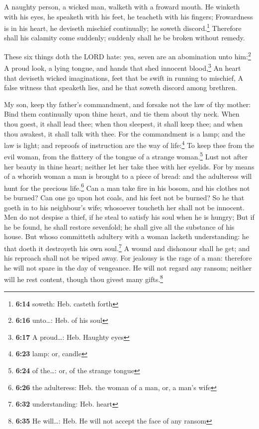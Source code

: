  A naughty person, a wicked man, walketh with a froward
mouth.  He winketh with his eyes, he speaketh with his
feet, he teacheth with his fingers;  Frowardness is in
his heart, he deviseth mischief continually; he soweth
discord.\footnote{\textbf{6:14} soweth: Heb. casteth forth}
 Therefore shall his calamity come suddenly; suddenly
shall he be broken without remedy.

 These six things doth the LORD hate: yea, seven are an
abomination unto him:\footnote{\textbf{6:16} unto\ldots: Heb. of his
  soul}  A proud look, a lying tongue, and hands that
shed innocent blood,\footnote{\textbf{6:17} A proud\ldots: Heb. Haughty
  eyes}  An heart that deviseth wicked imaginations, feet
that be swift in running to mischief,  A false witness
that speaketh lies, and he that soweth discord among brethren.

 My son, keep thy father's commandment, and forsake not
the law of thy mother:  Bind them continually upon thine
heart, and tie them about thy neck.  When thou goest, it
shall lead thee; when thou sleepest, it shall keep thee; and when thou
awakest, it shall talk with thee.  For the commandment is
a lamp; and the law is light; and reproofs of instruction are the way of
life:\footnote{\textbf{6:23} lamp: or, candle}  To keep
thee from the evil woman, from the flattery of the tongue of a strange
woman.\footnote{\textbf{6:24} of the\ldots: or, of the strange tongue}
 Lust not after her beauty in thine heart; neither let
her take thee with her eyelids.  For by means of a
whorish woman a man is brought to a piece of bread: and the adulteress
will hunt for the precious life.\footnote{\textbf{6:26} the adulteress:
  Heb. the woman of a man, or, a man's wife}  Can a man
take fire in his bosom, and his clothes not be burned? 
Can one go upon hot coals, and his feet not be burned? 
So he that goeth in to his neighbour's wife; whosoever toucheth her
shall not be innocent.  Men do not despise a thief, if he
steal to satisfy his soul when he is hungry;  But if he
be found, he shall restore sevenfold; he shall give all the substance of
his house.  But whoso committeth adultery with a woman
lacketh understanding: he that doeth it destroyeth his own
soul.\footnote{\textbf{6:32} understanding: Heb. heart} 
A wound and dishonour shall he get; and his reproach shall not be wiped
away.  For jealousy is the rage of a man: therefore he
will not spare in the day of vengeance.  He will not
regard any ransom; neither will he rest content, though thou givest many
gifts.\footnote{\textbf{6:35} He will\ldots: Heb. He will not accept the
  face of any ransom}


